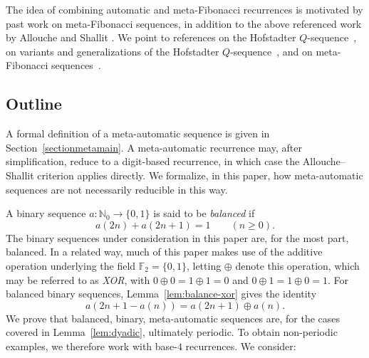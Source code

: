 \documentclass[12pt,reqno]{article}
\theoremstyle{plain}
\theoremstyle{definition}
\theoremstyle{remark}
\begin{document}
 The idea of combining automatic and meta-Fibonacci recurrences is motivated by past work on meta-Fibonacci sequences, in addition to 
 the above referenced work by Allouche and Shallit \cite{AlloucheShallit2012}. We point to references on the
 {H}ofstadter {$Q$}-sequence~\cite{Fox2020,Fox2016Quasipolynomial,Hendel2015,Pinn1999},
 on variants and generalizations of the
 {H}ofstadter {$Q$}-sequence~\cite{Alkan2018,AlkanFoxAybar2017,BalamohanKuznetsovTanny2007,Dekking2023,Fox2024,Tanny1992}, 
 and on meta-Fibonacci sequences~\cite{CaiTanny2008,CallaghanChewIIITanny2005,DaltonRahmanTanny2011,
DeugauRuskey2006,Emerson2006,Fox2016Linear,IsgurRahman2011,
IsgurReissTanny2009,JacksonRuskey2006,RuskeyDeugau2009,SobolewskiUlas2023}.

\subsection{Outline}
 A formal definition of a meta-automatic sequence is given in Section~\ref{sectionmetamain}. A meta-automatic recurrence may, after 
 simplification, reduce to a digit-based recurrence, in which case the Allouche--Shallit criterion applies directly. 
 We formalize, in this paper, how meta-automatic sequences are not necessarily reducible in this way. 

 A binary sequence $a:\mathbb{N}_0\to\{0,1\}$ is said to be \emph{balanced} if
\begin{equation}\label{eq:balance} 
 a(2n)+a(2n+1)=1\qquad (n\ge 0).
\end{equation}
 The binary sequences under consideration in this paper are, for the most part, balanced. In a related way, much of this paper makes 
 use of the additive operation underlying the field
 $\mathbb{F}_2 = \{0,1\}$, letting $\oplus$ denote this
 operation, which may be referred to as \emph{XOR}, with $0\oplus 0 = 
 1\oplus 1 = 0$ and $0\oplus 1 = 1\oplus 0 = 1$. For balanced binary sequences, Lemma~\ref{lem:balance-xor} gives the identity 
 $$ a(2n+1-a(n)) = a(2n+1)\oplus a(n). $$ We prove that balanced, binary, meta-automatic sequences are, for the cases 
 covered in Lemma~\ref{lem:dyadic}, ultimately periodic. To obtain non-periodic examples, we therefore work with base-$4$
 recurrences. We consider:
\end{document}
